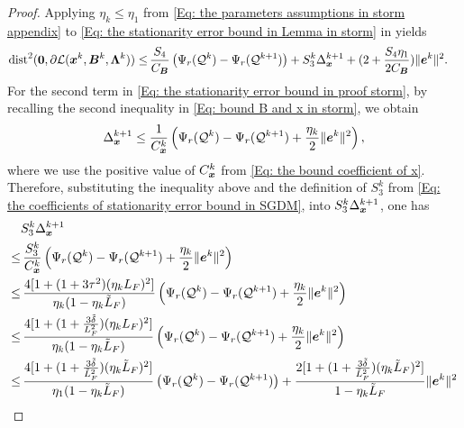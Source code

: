 \begin{proof}
    Applying $\eta_{k}\leq \eta_{1}$ from \eqref{Eq: the parameters assumptions in storm appendix}
    to \eqref{Eq: the stationarity error bound in Lemma in storm} in  yields
    \begin{align}
        \label{Eq: the stationarity error bound in proof storm}\text{dist}^{2}(\bm{0}, \partial \mathcal{L}(\bm{x}^{k}, \bm{B}^{k}, \bm{\Lambda}^{k})) \leq & \,\frac{S_{4}}{C_{\bm{B}}}\left( \Psi_r(\mathcal{Q}^{k}) - \Psi_r(\mathcal{Q}^{k+1}) \right) + S_{3}^{k}\Delta_{\bm{x}}^{k+1}+(2 + \frac{S_{4}\eta_{1}}{2C_{\bm{B}}})\| \bm{e}^{k}\|^{2}.
    \end{align}
    For the second term in \eqref{Eq: the stationarity error bound in proof storm},
    by recalling the second inequality in \eqref{Eq: bound B and x in storm}, we
    obtain
    \[
        \Delta_{\bm{x}}^{k+1}\leq \frac{1}{ C_{\bm{x}}^{k}}\left( \Psi_r(\mathcal{Q}
        ^{k}) - \Psi_r(\mathcal{Q}^{k+1}) +\frac{\eta_{k}}{2}\| \bm{e}^{k}\|^{2}
        \right),
    \] where we use the positive value of $C_{\bm{x}}^{k}$ from \eqref{Eq: the bound coefficient of x}. Therefore, substituting the inequality above and the definition of
    $S_{3}^{k}$ from \eqref{Eq: the coefficients of stationarity error bound in SGDM},
    into $S_{3}^{k}\Delta_{\bm{x}}^{k+1}$, one has
\begin{align}
\label{Eq: the scaling for x sequence}
&S_{3}^{k}\Delta_{\bx}^{k+1} \notag \\
\leq &\,\frac{S_{3}^{k}}{C_{\bx}^{k}}\left( \Psi_r(\mathcal{Q}^{k}) - \Psi_r(\mathcal{Q}^{k+1}) +\frac{\eta_{k}}{2}\| \be^{k}\|^{2}\right)\notag    \\
\leq &\, \frac{4 [ 1 + (1 + 3\tau^{2})(\eta_{k}L_{F})^{2}]}{\eta_{k}(1 - \eta_{k}\tilde{L}_{F})}\left( \Psi_r(\mathcal{Q}^{k}) - \Psi_r(\mathcal{Q}^{k+1}) +\frac{\eta_{k}}{2}\| \be^{k}\|^{2}\right) \notag                                                                                                                                    \\
\leq &\, \frac{4 [ 1 + (1 + \frac{3\tilde{\delta}}{L^2_F})(\eta_{k}L_{F})^{2}]}{\eta_{k}(1 - \eta_{k}\tilde{L}_{F})}\left( \Psi_r(\mathcal{Q}^{k}) - \Psi_r(\mathcal{Q}^{k+1}) + \frac{\eta_{k}}{2}\| \be^{k}\|^{2}\right) \notag                                                                                                               \\
\leq &\, \frac{4 [ 1 + (1 + \frac{3\tilde{\delta}}{\tilde{L}^2_F})(\eta_{k}\tilde{L}_{F})^{2}]}{\eta_{1}(1 - \eta_{k}\tilde{L}_{F})}\left( \Psi_r(\mathcal{Q}^{k}) - \Psi_r(\mathcal{Q}^{k+1})\right) + \frac{2 [ 1 + (1 + \frac{3\tilde{\delta}}{\tilde{L}^2_F})(\eta_{k}\tilde{L}_{F})^{2}]}{1 - \eta_{k}\tilde{L}_{F}}\| \be^{k}\|^{2}\notag \\

\end{align}
\end{proof}
